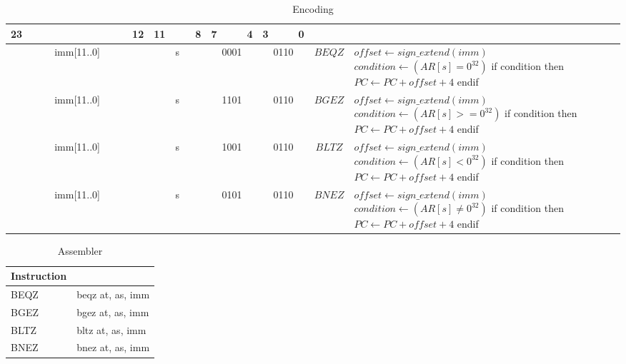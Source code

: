 	\begin{longtable}{llllllllllllllllllllllll  p{1cm}  p{7cm} | }
		\caption{Encoding\label{long}}\\
		23 & & & & & & & & & & & 12 & 11 & & & 8 & 7 & & & 4 & 3 & & & 0 & &
		\multicolumn{1}{c}{}\\
		\hline
		\multicolumn{12}{|c|}{imm[11..0]} & \multicolumn{4}{c|}{s} & \multicolumn{4}{c|}{0001} & \multicolumn{4}{c|}{0110} & \multicolumn{1}{c|}{$BEQZ$} & $offset \leftarrow sign\_extend(imm)$ \newline $condition \leftarrow (AR[s] = 0^{32})$ \newline if condition then \newline $PC \leftarrow PC + offset + 4$ \newline endif\\ \hline
		\multicolumn{12}{|c|}{imm[11..0]} & \multicolumn{4}{c|}{s} & \multicolumn{4}{c|}{1101} & \multicolumn{4}{c|}{0110} & \multicolumn{1}{c|}{$BGEZ$} & $offset \leftarrow sign\_extend(imm)$ \newline $condition \leftarrow (AR[s] >= 0^{32})$ \newline if condition then \newline $PC \leftarrow PC + offset + 4$ \newline endif\\ \hline
		\multicolumn{12}{|c|}{imm[11..0]} & \multicolumn{4}{c|}{s} & \multicolumn{4}{c|}{1001} & \multicolumn{4}{c|}{0110} & \multicolumn{1}{c|}{$BLTZ$} & $offset \leftarrow sign\_extend(imm)$ \newline $condition \leftarrow (AR[s] < 0^{32})$ \newline if condition then \newline $PC \leftarrow PC + offset + 4$ \newline endif\\ \hline
		\multicolumn{12}{|c|}{imm[11..0]} & \multicolumn{4}{c|}{s} & \multicolumn{4}{c|}{0101} & \multicolumn{4}{c|}{0110} & \multicolumn{1}{c|}{$BNEZ$} & $offset \leftarrow sign\_extend(imm)$ \newline $condition \leftarrow (AR[s] \neq 0^{32})$ \newline if condition then \newline $PC \leftarrow PC + offset + 4$ \newline endif\\ \hline
	\end{longtable}

	\begin{longtable}{|p{5cm}|p{5cm}|}
		\caption{Assembler\label{long}}\\		
		\hline
		Instruction & \\
		\hline
		BEQZ & beqz at, as, imm\\ \hline
		BGEZ & bgez at, as, imm\\ \hline
		BLTZ & bltz at, as, imm\\ \hline
		BNEZ & bnez at, as, imm\\ \hline
	\end{longtable}
